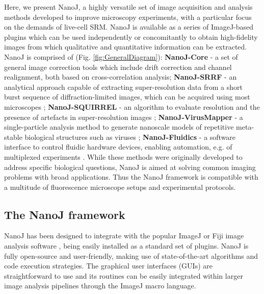 
 Here, we present NanoJ, a highly versatile set of image acquisition and analysis methods developed to improve microscopy experiments, with a particular focus on the demands of live-cell SRM. NanoJ is available as a series of ImageJ-based plugins which can be used independently or concomitantly to obtain high-fidelity images from which qualitative and quantitative information can be extracted. NanoJ is comprised of (Fig. \ref{fig:GeneralDiagram}): \textbf{NanoJ-Core} - a set of general image correction tools which include drift correction and channel realignment, both based on cross-correlation analysis; \textbf{NanoJ-SRRF} - an analytical approach capable of extracting super-resolution data from a short burst sequence of diffraction-limited images, which can be acquired using most microscopes \cite{gustafsson2016fast,culley2018srrf}; \textbf{NanoJ-SQUIRREL} - an algorithm to evaluate resolution and the presence of artefacts in super-resolution images \cite{culley2018quantitative}; \textbf{NanoJ-VirusMapper} - a single-particle analysis method to generate nanoscale models of repetitive meta-stable biological structures such as viruses \cite{Gray2016,Gray2017,gray2018nanoscale}; \textbf{NanoJ-Fluidics} - a software interface to control fluidic hardware devices, enabling automation, e.g. of multiplexed experiments \cite{almada2018automating}. While these methods were originally developed to address specific biological questions, NanoJ is aimed at solving common imaging problems with broad applications. Thus the NanoJ framework is compatible with a multitude of fluorescence microscope setups and experimental protocols. 
 
\subsection*{The NanoJ framework}
 NanoJ has been designed to integrate with the popular ImageJ or Fiji image analysis software \cite{abramoff2004image,schindelin2012fiji}, being easily installed as a standard set of plugins. NanoJ is fully open-source and user-friendly, making use of state-of-the-art algorithms and code execution strategies. The graphical user interfaces (GUIs) are straightforward to use and its routines can be easily integrated within larger image analysis pipelines through the ImageJ macro language.

